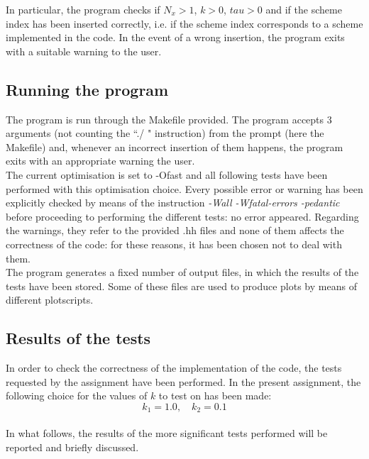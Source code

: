 \documentclass[11pt]{article}
\theoremstyle{theorem}
\theoremstyle{definition}
\begin{document}
In particular, the program checks if $N_x>1$, $k>0$, $tau>0$ and if the scheme index has been inserted correctly, i.e. if the scheme index corresponds to a scheme implemented in the code. In the event of a wrong insertion, the program exits with a suitable warning to the user.\\

\subsection{Running the program}
The program is run through the Makefile provided.
The program accepts 3 arguments (not counting the ``./ " instruction) from the prompt (here the Makefile) and, whenever an incorrect insertion of them happens, the program exits with an appropriate warning the user.\\
The current optimisation is set to -Ofast and all following tests have been performed with this optimisation choice. Every possible error or warning has been explicitly checked by means of the instruction \emph{-Wall -Wfatal-errors -pedantic} before proceeding to performing the different tests: no error appeared. Regarding the warnings, they refer to the provided .hh files and none of them affects the correctness of the code: for these reasons, it has been chosen not to deal with them.\\
The program generates a fixed number of output files, in which the results of the tests have been stored. Some of these files are used to produce plots by means of different plotscripts.\\

\subsection{Results of the tests}
In order to check the correctness of the implementation of the code, the tests requested by the assignment have been performed. In the present assignment, the following choice for the values of $k$ to test on has been made:
$$k_1=1.0, \quad k_2=0.1$$\\
In what follows, the results of the more significant tests performed will be reported and briefly discussed.\\
\end{document}
